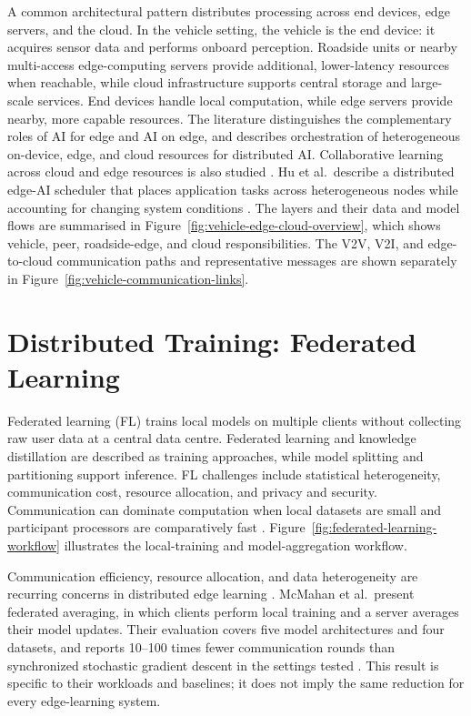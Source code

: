 \documentclass[12pt,a4paper,oneside]{report}
\begin{document}
A common architectural pattern distributes processing across end devices,
edge servers, and the cloud. In the vehicle setting, the vehicle is the end
device: it acquires sensor data and performs onboard perception. Roadside
units or nearby multi-access edge-computing servers provide additional,
lower-latency resources when reachable, while cloud infrastructure supports
central storage and large-scale services. End devices handle local
computation, while edge servers provide nearby, more capable resources.
The literature distinguishes the complementary roles of AI for edge and AI
on edge, and describes orchestration of heterogeneous on-device, edge,
and cloud resources for distributed AI. Collaborative learning across
cloud and edge resources is also studied \cite{deng2020}. Hu et al.\ describe
a distributed edge-AI scheduler that places application tasks across
heterogeneous nodes while accounting for changing system conditions
\cite{hu2023}. The layers and their data and model flows are summarised in
Figure~\ref{fig:vehicle-edge-cloud-overview}, which shows vehicle, peer,
roadside-edge, and cloud responsibilities. The V2V, V2I, and edge-to-cloud
communication paths and representative messages are shown separately in
Figure~\ref{fig:vehicle-communication-links}.

\section{Distributed Training: Federated Learning}

Federated learning (FL) trains local models on multiple clients without
collecting raw user data at a central data centre. Federated learning
and knowledge distillation are described as training approaches, while model
splitting and partitioning support inference. FL challenges include
statistical heterogeneity, communication cost, resource allocation, and
privacy and security. Communication can dominate computation when local
datasets are small and participant processors are comparatively fast
\cite{deng2020}. Figure~\ref{fig:federated-learning-workflow} illustrates
the local-training and model-aggregation workflow.

Communication efficiency, resource allocation, and data heterogeneity are
recurring concerns in distributed edge learning \cite{deng2020}.
McMahan et al.\ present federated averaging, in which clients perform local
training and a server averages their model updates. Their evaluation covers
five model architectures and four datasets, and reports 10--100 times fewer
communication rounds than synchronized stochastic gradient descent in the
settings tested \cite{mcmahan2017}. This result is specific to their
workloads and baselines; it does not imply the same reduction for every
edge-learning system.
\end{document}
